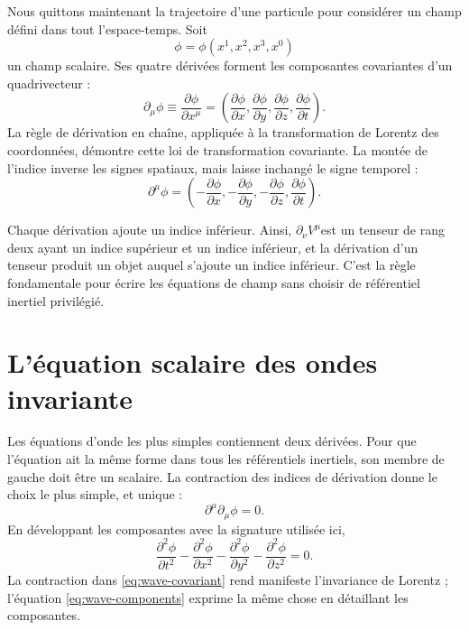 Nous quittons maintenant la trajectoire d’une particule pour considérer un champ défini dans tout l’espace-temps. Soit
\begin{equation}
  \phi=\phi(x^1,x^2,x^3,x^0)
\end{equation}
un champ scalaire. Ses quatre dérivées forment les composantes covariantes d’un quadrivecteur :
\begin{equation}
  \partial_\mu\phi
  \equiv\frac{\partial\phi}{\partial x^\mu}
  =\left(
    \frac{\partial\phi}{\partial x},
    \frac{\partial\phi}{\partial y},
    \frac{\partial\phi}{\partial z},
    \frac{\partial\phi}{\partial t}
  \right).
\end{equation}
La règle de dérivation en chaîne, appliquée à la transformation de Lorentz des coordonnées, démontre cette loi de transformation covariante. La montée de l’indice inverse les signes spatiaux, mais laisse inchangé le signe temporel :
\begin{equation}
  \partial^\mu\phi
  =\left(
    -\frac{\partial\phi}{\partial x},
    -\frac{\partial\phi}{\partial y},
    -\frac{\partial\phi}{\partial z},
    \frac{\partial\phi}{\partial t}
  \right).
\end{equation}

Chaque dérivation ajoute un indice inférieur. Ainsi,
\(\partial_\nu V^\mu\)est un tenseur de rang deux ayant un indice supérieur et un indice inférieur, et la dérivation d’un tenseur produit un objet auquel s’ajoute un indice inférieur. C’est la règle fondamentale pour écrire les équations de champ sans choisir de référentiel inertiel privilégié.

\section{L’équation scalaire des ondes invariante}

Les équations d’onde les plus simples contiennent deux dérivées. Pour que l’équation ait la même forme dans tous les référentiels inertiels, son membre de gauche doit être un scalaire. La contraction des indices de dérivation donne le choix le plus simple, et unique :
\begin{equation}
  \boxed{\partial^\mu\partial_\mu\phi=0.}
  \label{eq:wave-covariant}
\end{equation}
En développant les composantes avec la signature utilisée ici,
\begin{equation}
  \frac{\partial^2\phi}{\partial t^2}
  -\frac{\partial^2\phi}{\partial x^2}
  -\frac{\partial^2\phi}{\partial y^2}
  -\frac{\partial^2\phi}{\partial z^2}=0.
  \label{eq:wave-components}
\end{equation}
La contraction dans \eqref{eq:wave-covariant} rend manifeste l’invariance de Lorentz ; l’équation \eqref{eq:wave-components} exprime la même chose en détaillant les composantes.

